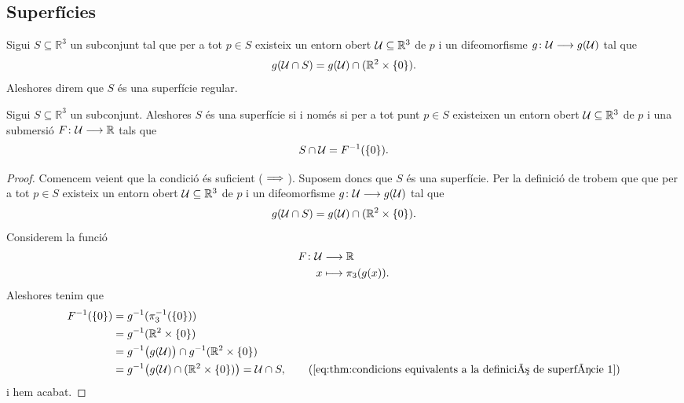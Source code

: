 \documentclass[../../Main.tex]{subfiles}
\begin{document}
	\subsection{Superfícies}
	\begin{definition}[Superfície]
		\label{def:superfície}
		Sigui \(S\subseteq\mathbb{R}^{3}\) un subconjunt tal que per a tot \(p\in S\) existeix un entorn obert \(\mathcal{U}\subseteq\mathbb{R}^{3}\) de \(p\) i un difeomorfisme \(g\colon\mathcal{U}\longrightarrow g(\mathcal{U})\) tal que
		\[
		    g(\mathcal{U}\cap S)=g(\mathcal{U})\cap(\mathbb{R}^{2}\times\{0\}).
		\]
		Aleshores direm que \(S\) és una superfície regular.
	\end{definition}
	\begin{theorem}
		\label{thm:condicions equivalents a la definició de superfície}
		Sigui \(S\subseteq\mathbb{R}^{3}\) un subconjunt. Aleshores \(S\) és una superfície si i només si per a tot punt \(p\in S\) existeixen un entorn obert \(\mathcal{U}\subseteq\mathbb{R}^{3}\) de \(p\) i una submersió \(F\colon\mathcal{U}\longrightarrow\mathbb{R}\) tals que
		\[
		    S\cap\mathcal{U}=F^{-1}(\{0\}).
		\]
		\begin{proof}
			Comencem veient que la condició és suficient (\(\implies\)). Suposem doncs que \(S\) és una superfície. Per la definició de  trobem que que per a tot \(p\in S\) existeix un entorn obert \(\mathcal{U}\subseteq\mathbb{R}^{3}\) de \(p\) i un difeomorfisme \(g\colon\mathcal{U}\longrightarrow g(\mathcal{U})\) tal que
			\begin{equation}
				\label{eq:thm:condicions equivalents a la definició de superfície 1}
				g(\mathcal{U}\cap S)=g(\mathcal{U})\cap(\mathbb{R}^{2}\times\{0\}).
			\end{equation}
			Considerem la funció
			\begin{align*}
				F\colon\mathcal{U}&\longrightarrow\mathbb{R} \\
				x&\longmapsto\pi_{3}(g(x)).
			\end{align*}
			Aleshores tenim que
			\begin{align*}
				F^{-1}(\{0\})&=g^{-1}(\pi_{3}^{-1}(\{0\})) \\
				&=g^{-1}(\mathbb{R}^{2}\times\{0\}) \\
				&=g^{-1}\big(g(\obert{U})\big)\cap g^{-1}(\mathbb{R}^{2}\times\{0\})\\
				&=g^{-1}\big(g(\obert{U})\cap(\mathbb{R}^{2}\times\{0\})\big)=\obert{U}\cap S, \tag{\ref{eq:thm:condicions equivalents a la definició de superfície 1}} %
			\end{align*}
			i hem acabat.
			

\end{proof}
\end{theorem}
\end{document}

